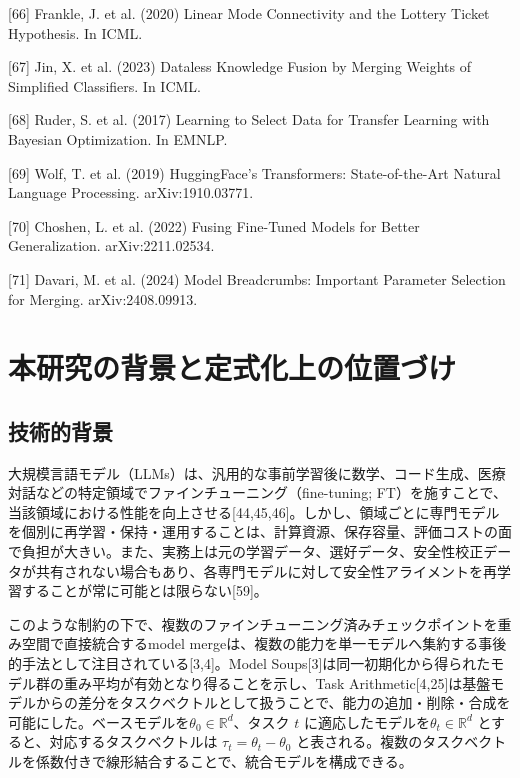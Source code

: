 \documentclass{article}
\begin{document}
{[66] Frankle, J. et al. (2020) Linear Mode Connectivity and the Lottery Ticket Hypothesis. In ICML.

[67] Jin, X. et al. (2023) Dataless Knowledge Fusion by Merging Weights of Simplified Classifiers. In ICML.

[68] Ruder, S. et al. (2017) Learning to Select Data for Transfer Learning with Bayesian Optimization. In EMNLP.

[69] Wolf, T. et al. (2019) HuggingFace's Transformers: State-of-the-Art Natural Language Processing. arXiv:1910.03771.

[70] Choshen, L. et al. (2022) Fusing Fine-Tuned Models for Better Generalization. arXiv:2211.02534.

[71] Davari, M. et al. (2024) Model Breadcrumbs: Important Parameter Selection for Merging. arXiv:2408.09913.
}


\newpage
\appendix

\section{本研究の背景と定式化上の位置づけ}
\label{app:background_and_formulation}

\subsection{技術的背景}
大規模言語モデル（LLMs）は、汎用的な事前学習後に数学、コード生成、医療対話などの特定領域でファインチューニング（fine-tuning; FT）を施すことで、当該領域における性能を向上させる[44,45,46]。しかし、領域ごとに専門モデルを個別に再学習・保持・運用することは、計算資源、保存容量、評価コストの面で負担が大きい。また、実務上は元の学習データ、選好データ、安全性校正データが共有されない場合もあり、各専門モデルに対して安全性アライメントを再学習することが常に可能とは限らない[59]。

このような制約の下で、複数のファインチューニング済みチェックポイントを重み空間で直接統合するmodel mergeは、複数の能力を単一モデルへ集約する事後的手法として注目されている[3,4]。Model Soups[3]は同一初期化から得られたモデル群の重み平均が有効となり得ることを示し、Task Arithmetic[4,25]は基盤モデルからの差分をタスクベクトルとして扱うことで、能力の追加・削除・合成を可能にした。ベースモデルを\(\theta_0 \in \mathbb{R}^d\)、タスク \(t\) に適応したモデルを\(\theta_t \in \mathbb{R}^d\) とすると、対応するタスクベクトルは \(\tau_t = \theta_t - \theta_0\) と表される。複数のタスクベクトルを係数付きで線形結合することで、統合モデルを構成できる。
\end{document}
